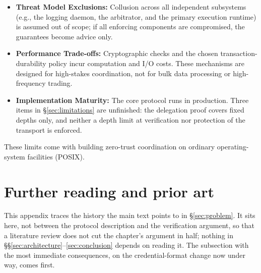 \documentclass[11pt,a4paper]{article}
\theoremstyle{definition}
\begin{document}
\begin{itemize}
    \item \textbf{Threat Model Exclusions:} Collusion across all independent subsystems (e.g., the logging daemon, the arbitrator, and the primary execution runtime) is assumed out of scope; if all enforcing components are compromised, the guarantees become advice only.
    \item \textbf{Performance Trade-offs:} Cryptographic checks and the chosen transaction-durability policy incur computation and I/O costs. These mechanisms are designed for high-stakes coordination, not for bulk data processing or high-frequency trading.
    \item \textbf{Implementation Maturity:} The core protocol runs in production. Three items in \S\ref{sec:limitations} are unfinished: the delegation proof covers fixed depths only, and neither a depth limit at verification nor protection of the transport is enforced.
\end{itemize}

These limits come with building zero-trust coordination on ordinary operating-system facilities (POSIX).

\section{Further reading and prior art}\label{app:related}

This appendix traces the history the main text points to in \S\ref{sec:problem}. It sits here, not between the protocol description and the verification argument, so that a literature review does not cut the chapter's argument in half; nothing in \S\S\ref{sec:architecture}--\ref{sec:conclusion} depends on reading it. The subsection with the most immediate consequences, on the credential-format change now under way, comes first.
\end{document}
